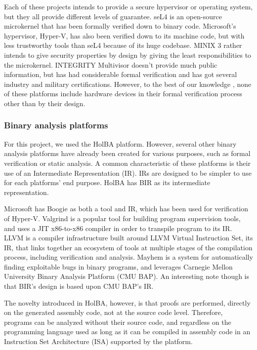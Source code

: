 \documentclass[10pt,a4paper]{article}
\begin{document}
\begin{multicols}{2}
Each of these projects intends to provide a secure hypervisor or operating system, but they all provide different levels of guarantee. seL4 is an open-source microkernel that has been formally verified down to binary code. Microsoft's hypervisor, Hyper-V, has also been verified down to its machine code, but with less trustworthy tools than seL4 because of its huge codebase. MINIX 3 rather intends to give security properties by design by giving the least responsibilities to the microkernel. INTEGRITY Multivisor doesn't provide much public information, but has had considerable formal verification and has got several industry and military certifications. However, to the best of our knowledge , none of these platforms include hardware devices in their formal verification process other than by their design.

\subsubsection{Binary analysis platforms}

For this project, we used the {HolBA} platform. However, several other binary analysis platforms have already been created for various purposes, such as formal verification or static analysis. A common characteristic of these platforms is their use of an Intermediate Representation ({IR}). IRs are designed to be simpler to use for each platforms' end purpose. HolBA has BIR as its intermediate representation.

Microsoft has Boogie as both a tool and IR, which has been used for verification of {Hyper\nobreakdash-\hspace{0pt}V}. Valgrind is a popular tool for building program supervision tools, and uses a JIT x86-to-x86 compiler in order to transpile program to its IR. LLVM is a compiler infrastructure built around LLVM Virtual Instruction Set, its {IR}, that links together an ecosystem of tools at multiple stages of the compilation process, including verification and analysis. Mayhem is a system for automatically finding exploitable bugs in binary programs, and leverages Carnegie Mellon University Binary Analysis Platform (CMU BAP). An interesting note though is that BIR's design is based upon CMU BAP's IR.

The novelty introduced in HolBA, however, is that proofs are performed, directly on the generated assembly code, not at the source code level. Therefore, programs can be analyzed without their source code, and regardless on the programming language used as long as it can be compiled in assembly code in an Instruction Set Architecture ({ISA}) supported by the platform.


\end{multicols}
\end{document}
